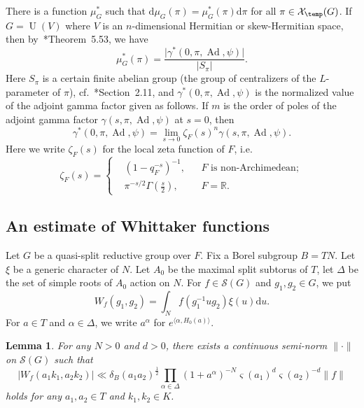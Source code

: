\documentclass[letterpaper,11pt]{amsart}
\newcommand{\R}{\mathbb{R}}
\newcommand{\cS}{\mathcal{S}}
\newcommand{\cX}{\mathcal{X}}
\newcommand{\rd}{\mathrm{d}}
\newcommand{\<}{\negthickspace}
\providecommand{\abs}[1]{\lvert#1\rvert}
\DeclareMathOperator{\U}{U}
\DeclareMathOperator{\Ad}{Ad}
\theoremstyle{definition}
\theoremstyle{plain}
\newtheorem{lemma}[definition]{Lemma}
\theoremstyle{remark}
\numberwithin{equation}{section}
\begin{document}
There is a function $\mu_G^*$ such that $\rd \mu_G(\pi) = \mu^*_G(\pi) \rd
\pi$ for all $\pi \in \cX_{\temp}(G)$. If $G = \U(V)$ where $V$ is an $n$-dimensional Hermitian or skew-Hermitian space, then by~\cite{BP1}*{Theorem~5.53}, we have
    \begin{equation}    \label{eq:formal_degree_conjecture}
    \mu^*_G(\pi) = \frac{\abs{\gamma^*(0, \pi, \Ad, \psi)}}{\abs{S_{\pi}}}.
    \end{equation}
Here $S_{\pi}$ is a certain finite abelian group (the group of centralizers
of the $L$-parameter of $\pi$), cf.~\cite{BP1}*{Section~2.11}, and
$\gamma^*(0, \pi, \Ad, \psi)$ is the normalized value of the adjoint gamma
factor given as follows. If $m$ is the order of poles of the adjoint gamma factor $\gamma(s, \pi, \Ad, \psi)$ at $s = 0$, then 
    \[
    \gamma^*(0, \pi, \Ad, \psi) = \lim_{s \to 0} \zeta_F(s)^n \gamma(s, \pi, \Ad, \psi).
    \]
Here we write $\zeta_F(s)$ for the local zeta function of $F$, i.e.
    \[
    \zeta_F(s) = \left\{
    \begin{aligned} &(1-q_F^{-s})^{-1}, &&\text{$F$ is non-Archimedean};\\
    & \pi^{-s/2} \Gamma(\frac{s}{2}), && F = \R.
    \end{aligned}
    \right.
    \]
    

\subsection{An estimate of Whittaker functions}
Let $G$ be a quasi-split reductive group over $F$. Fix a Borel subgroup $B=TN$. Let $\xi$ be a generic character of $N$. Let $A_0$ be the maximal split subtorus of $T$, let $\Delta$ be the set of simple roots of $A_0$ action on $N$. For $f \in \cS(G)$ and $g_1,g_2 \in G$, we put
\begin{equation*}
    W_f(g_1,g_2) = \int_N f(g_1^{-1}ug_2) \xi(u) \rd u.
\end{equation*}
For $a \in T$ and $\alpha \in \Delta$, we write $a^{\alpha}$ for $e^{\langle \alpha,H_0(a) \rangle}$.

\begin{lemma} \label{lem:W_f_Estimate}
    For any $N>0$ and $d>0$, there exists a continuous semi-norm $\| \cdot \|$ on $\cS(G)$ such that
    \begin{equation*}
        \lvert W_f(a_1k_1,a_2k_2) \rvert \ll \delta_B(a_1a_2)^{\frac{1}{2}} \prod_{\alpha \in \Delta} (1+a^{\alpha})^{-N} \varsigma(a_1)^d \varsigma(a_2)^{-d}  \lVert f \rVert
    \end{equation*}
    holds for any $a_1,a_2 \in T$ and $k_1,k_2 \in K$.
\end{lemma}
\end{document}
